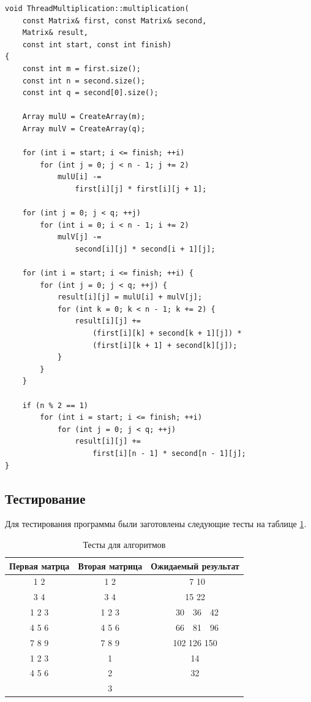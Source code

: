 \documentclass[a4paper,12pt]{article}
\begin{document}
\begin{lstlisting}[caption=Алгоритм Винограда умножения матриц,label=vinth]
void ThreadMultiplication::multiplication(
    const Matrix& first, const Matrix& second,
    Matrix& result,
    const int start, const int finish)
{
    const int m = first.size();
    const int n = second.size();
    const int q = second[0].size();

    Array mulU = CreateArray(m);
    Array mulV = CreateArray(q);

    for (int i = start; i <= finish; ++i)
        for (int j = 0; j < n - 1; j += 2)
            mulU[i] -=
                first[i][j] * first[i][j + 1];

    for (int j = 0; j < q; ++j)
        for (int i = 0; i < n - 1; i += 2)
            mulV[j] -=
                second[i][j] * second[i + 1][j];

    for (int i = start; i <= finish; ++i) {
        for (int j = 0; j < q; ++j) {
            result[i][j] = mulU[i] + mulV[j];
            for (int k = 0; k < n - 1; k += 2) {
                result[i][j] +=
                    (first[i][k] + second[k + 1][j]) *
                    (first[i][k + 1] + second[k][j]);
            }
        }
    }

    if (n % 2 == 1)
        for (int i = start; i <= finish; ++i)
            for (int j = 0; j < q; ++j)
                result[i][j] +=
                    first[i][n - 1] * second[n - 1][j];
}
\end{lstlisting}

\subsection{Тестирование}

Для тестирования программы были заготовлены следующие тесты на таблице
\ref{table:test}.

\begin{table}[H]
    \caption{Тесты для алгоритмов}
    \label{table:test}
    \centering
    \begin{tabular}{|c|c|c|}
        \hline
        Первая матрца & Вторая матрица & Ожидаемый результат \\
        \hline
        1 2 & 1 2 & \ 7 10 \\
        3 4 & 3 4 & 15 22 \\
        \hline
        1 2 3 & 1 2 3 & \ 30\ \ 36\ \ 42 \\
        4 5 6 & 4 5 6 & \ 66\ \ 81\ \ 96 \\
        7 8 9 & 7 8 9 & 102 126 150 \\
        \hline
        1 2 3 & 1 & 14 \\
        4 5 6 & 2 & 32 \\
              & 3 & \\
        \hline
    \end{tabular}
\end{table}
\end{document}
